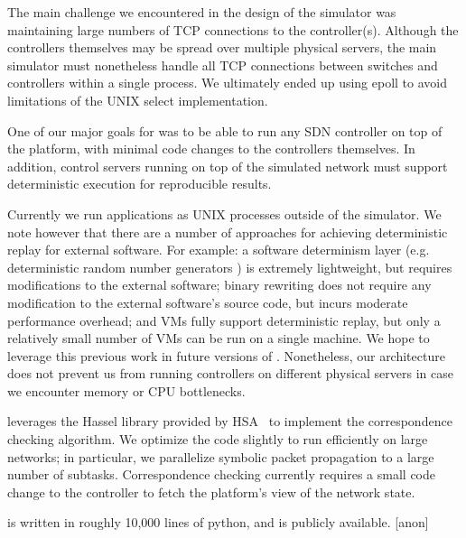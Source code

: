 {The main challenge we encountered in the design of the simulator was
maintaining large numbers of TCP connections to the
controller(s). Although the controllers themselves may be spread
over multiple physical servers, the main simulator must nonetheless handle all
TCP connections between switches and controllers within a single process.
We ultimately ended up using epoll to avoid limitations of the UNIX select
implementation.

 One of our major goals for \projectname{}
was to be able to run any SDN controller on top of the platform, with minimal
code changes to the controllers themselves. In addition, control servers
running on top of the simulated network must support deterministic execution
for reproducible results.

Currently we run applications as UNIX processes outside of the simulator.
We note however that there are a number of approaches for achieving deterministic
replay for external software. For example: a software determinism layer (e.g.
deterministic random number generators ) is
extremely lightweight, but requires modifications to the external software;
binary rewriting does not require any modification to the external
software's source code, but incurs moderate performance overhead; and VMs
fully support deterministic replay, but only a relatively small number of VMs can be run
on a single machine. We hope to leverage this previous work in future versions
of \projectname{}. Nonetheless, our architecture does not prevent us from
running controllers on different physical
servers in case we encounter memory or CPU bottlenecks.

\projectname{} leverages the Hassel library provided by HSA~\cite{hsa}
to implement the correspondence checking algorithm. We optimize the code
slightly to run efficiently on large networks; in particular, we parallelize
symbolic packet propagation to a large number of subtasks. Correspondence
checking currently requires a small code change to the controller to fetch
the platform's view of the network state.

\projectname{} is written in roughly 10,000 lines of python, and is publicly
available. [anon]

}
